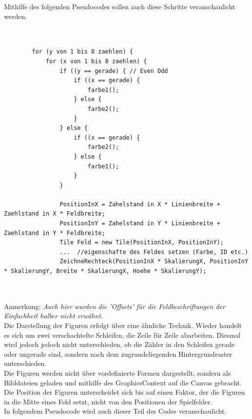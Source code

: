 \documentclass[12pt,a4paper]{article}
\begin{document}
Mithilfe des folgenden Pseudocodes sollen auch diese Schritte veranschaulicht werden.
\lstset{language=java}
\begin{lstlisting}

	
		for (y von 1 bis 8 zaehlen) {
			for (x von 1 bis 8 zaehlen) {
				if ((y == gerade) { // Even Odd
					if ((x == gerade) {
						farbe1();
					} else {
						farbe2();
					}
				} else {
					if ((x == gerade) {
						farbe2();
					} else {
						farbe1();
					}
				}
				
				PositionInX = Zahelstand in X * Linienbreite + Zaehlstand in X * Feldbreite;
				PositionInY = Zahelstand in Y * Linienbreite + Zaehlstand in Y * Feldbreite;
				Tile Feld = new Tile(PositionInX, PositionInY);
 				...  //eigenschafte des Feldes setzen (Farbe, ID etc.)
				ZeichneRechteck(PositionInX * SkalierungX, PositionInY * SkalierungY, Breite * SkalierungX, Hoehe * SkalierungY);

	
\end{lstlisting}
Anmerkung: \textit{Auch hier wurden die 'Offsets' für die Feldbeschriftungen der Einfachheit halber nicht erwähnt.}\\[2ex]
Die Darstellung der Figuren erfolgt über eine ähnliche Technik. Wieder handelt es sich um zwei verschachtelte Schleifen, die Zeile für Zeile abarbeiten. Diesmal wird jedoch jedoch nicht unterschieden, ob die Zähler in den Schleifen gerade oder ungerade sind, sondern nach dem zugrundeliegenden Hintergrundraster unterschieden.\\
Die Figuren werden nicht über vordefinierte Formen dargestellt, sondern als Bilddateien geladen und mithilfe des GraphicsContext auf die Canvas gebracht. Die Position der Figuren unterscheidet sich bis auf einen Faktor, der die Figuren in die Mitte eines Feld setzt, nicht von den Positionen der Spielfelder. \\[2ex]
In folgendem Pseudocode wird auch dieser Teil des Codes veranschaulicht.
\lstset{language=java}
\end{document}
